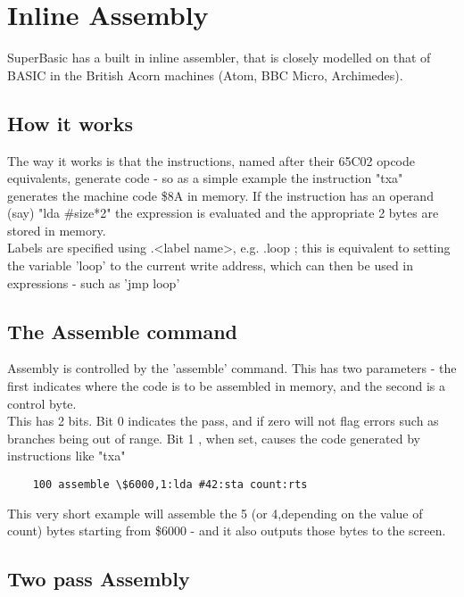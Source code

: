 \chapter{Inline Assembly}

SuperBasic has a built in inline assembler, that is closely modelled on that of BASIC in the British Acorn machines (Atom, BBC Micro, Archimedes).\\

\section{How it works}

The way it works is that the instructions, named after their 65C02 opcode equivalents, generate code - so as a simple example the instruction "txa" generates the machine code \$8A in memory. If the instruction has an operand (say) "lda \#size*2" the expression is evaluated and the appropriate 2 bytes are stored in memory. \\

Labels are specified using .<label name>, e.g. .loop ; this is equivalent to setting the variable 'loop' to the current write address, which can then be used in expressions - such as 'jmp loop'

\section {The Assemble command}

Assembly is controlled by the 'assemble' command. This has two parameters - the first indicates where the code is to be assembled in memory, and the second is a control byte. \\

This has 2 bits.  Bit 0 indicates the pass, and if zero will not flag errors such as branches being out of range. Bit 1 , when set, causes the code generated by instructions like "txa"

\begin{verbatim}
	100 assemble \$6000,1:lda #42:sta count:rts
\end{verbatim}

This very short example will assemble the 5 (or 4,depending on the value of count) bytes starting from \$6000 - and it also outputs those bytes to the screen. \\

\section {Two pass Assembly}

